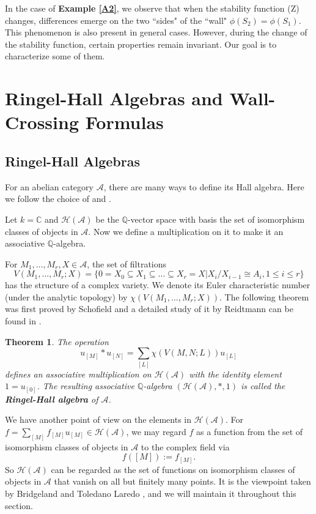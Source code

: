 \documentclass[a4paper,12pt]{amsart}
\newtheorem{theorem}{Theorem}[section]
\begin{document}
In the case of \textbf{Example 
\ref{A2}}, we observe that when the stability function (Z) changes, differences emerge on the two ``sides" of the ``wall" $\phi(S_2)=\phi(S_1)$. This phenomenon is also present in general cases. However, during the change of the stability function, certain properties remain invariant. Our goal is to characterize some of them.
\section{Ringel-Hall Algebras and Wall-Crossing Formulas}
\subsection{Ringel-Hall Algebras}
For an abelian category $\mathcal{A}$, there are many ways to define its Hall
algebra. Here we follow the choice of \cite{BT2012} and \cite{Rei2002}.

Let $k=\mathbb{C}$ and $\mathcal{H}(\mathcal{A})$ be the $\mathbb{Q}$-vector space with basis the set of isomorphism classes of objects in $\mathcal{A}$. Now we define a multiplication on it to make it an associative $\mathbb{Q}$-algebra.

For $M_1,\dots,M_r,X\in\mathcal{A}$, the set of filtrations
\[V(M_1,\dots,M_r;X)=\{0=X_0\subseteq X_1\subseteq\dots\subseteq X_r=X|X_i/X_{i-1}\cong A_i,1\leqslant i\leqslant r\}\]
has the structure of a complex variety. We denote its Euler characteristic number (under the analytic topology) by $\chi(V(M_1,\dots,M_r;X))$. The following theorem was first proved by Schofield and a detailed study of it by Reidtmann can be found in \cite{Rie1994}.
\begin{theorem}
    The operation
    \[u_{[M]}*u_{[N]}=\sum_{[L]}\chi(V(M,N;L))u_{[L]}\]
    defines an associative multiplication on $\mathcal{H}(\mathcal{A})$ with the identity element $1=u_{[0]}$. The resulting associative $\mathbb{Q}$-algebra $(\mathcal{H}(\mathcal{A}),*,1)$ is called the \textbf{Ringel-Hall algebra} of $\mathcal{A}$.
\end{theorem}
We have another point of view on the elements in $\mathcal{H}(\mathcal{A})$. For $f=\sum_{[M]}f_{[M]}u_{[M]}\in\mathcal{H}(\mathcal{A})$, we may regard $f$ as a function from the set of isomorphism classes of objects in $\mathcal{A}$ to the complex field via
\[f([M]):=f_{[M]}.\]
So $\mathcal{H}(\mathcal{A})$ can be regarded as the set of functions on isomorphism classes of objects in $\mathcal{A}$ that vanish on all but finitely many points.
It is the viewpoint taken by Bridgeland and Toledano Laredo \cite{BT2012}, and we will maintain it throughout this section.
\end{document}
